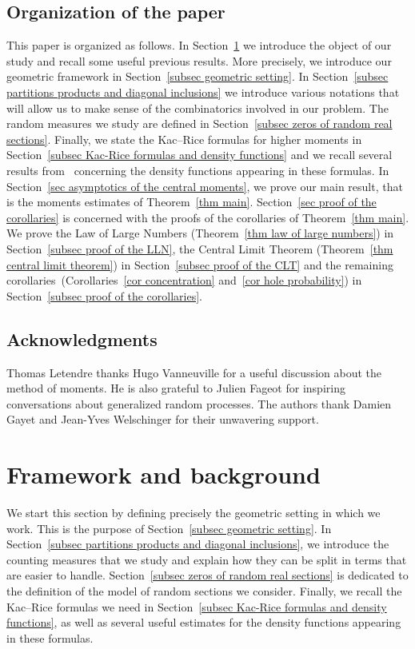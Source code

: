 \documentclass[10pt]{amsart}
\theoremstyle{definition}\newtheorem{defi}[theo]{Definition}\newtheorem{rema}[theo]{Remark}\newtheorem{exam}[theo]{Example}\newtheorem{exem}[theo]{Example}\newtheorem{nota}[theo]{Notation}
\begin{document}
\subsection*{Organization of the paper}

This paper is organized as follows. In Section~\ref{sec framework and background} we introduce the object of our study and recall some useful previous results. More precisely, we introduce our geometric framework in Section~\ref{subsec geometric setting}. In Section~\ref{subsec partitions products and diagonal inclusions} we introduce various notations that will allow us to make sense of the combinatorics involved in our problem. The random measures we study are defined in Section~\ref{subsec zeros of random real sections}. Finally, we state the Kac--Rice formulas for higher moments in Section~\ref{subsec Kac-Rice formulas and density functions} and we recall several results from~\cite{Anc2019} concerning the density functions appearing in these formulas. In Section~\ref{sec asymptotics of the central moments}, we prove our main result, that is the moments estimates of Theorem~\ref{thm main}. Section~\ref{sec proof of the corollaries} is concerned with the proofs of the corollaries of Theorem~\ref{thm main}. We prove the Law of Large Numbers (Theorem~\ref{thm law of large numbers}) in Section~\ref{subsec proof of the LLN}, the Central Limit Theorem (Theorem~\ref{thm central limit theorem}) in Section~\ref{subsec proof of the CLT} and the remaining corollaries~(Corollaries~\ref{cor concentration} and~\ref{cor hole probability}) in Section~\ref{subsec proof of the corollaries}.


\subsection*{Acknowledgments}

Thomas Letendre thanks Hugo Vanneuville for a useful discussion about the method of moments. He is also grateful to Julien Fageot for inspiring conversations about generalized random processes. The authors thank Damien Gayet and Jean-Yves Welschinger for their unwavering support.



\section{Framework and background}\label{sec framework and background}

We start this section by defining precisely the geometric setting in which we work. This is the purpose of Section~\ref{subsec geometric setting}. In Section~\ref{subsec partitions products and diagonal inclusions}, we introduce the counting measures that we study and explain how they can be split in terms that are easier to handle. Section~\ref{subsec zeros of random real sections} is dedicated to the definition of the model of random sections we consider. Finally, we recall the Kac--Rice formulas we need in Section~\ref{subsec Kac-Rice formulas and density functions}, as well as several useful estimates for the density functions appearing in these formulas.
\end{document}
